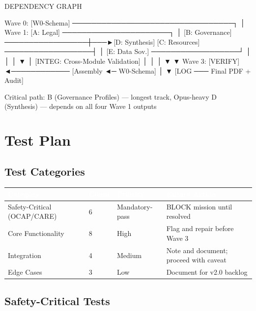 \documentclass[11pt,letterpaper]{article}
\newcommand{\tableheader}[1]{\textbf{\sffamily\textcolor{white}{#1}}}
\begin{document}
\begin{asciibox}
DEPENDENCY GRAPH

Wave 0: [W0-Schema] ─────────────────────────────────┐
                                                      │
Wave 1:  [A: Legal] ──────────────────────┐           │
         [B: Governance] ─────────────────┼───►[D: Synthesis]
         [C: Resources] ──────────────────┤           │
         [E: Data Sov.] ──────────────────┘           │
                              │                        │
                              ▼                        │
           [INTEG: Cross-Module Validation]            │
                              │                        │
                              ▼                        ▼
Wave 3:          [VERIFY] ◄──────────── [Assembly ◄─ W0-Schema]
                    │
                    ▼
                [LOG ─── Final PDF + Audit]

Critical path: B (Governance Profiles) — longest track, Opus-heavy
               D (Synthesis) — depends on all four Wave 1 outputs
\end{asciibox}

\section{Test Plan}

\subsection{Test Categories}

\begin{center}
\begin{tabularx}{\textwidth}{L{3.5cm}C{1.5cm}L{2cm}X}
\toprule
{}
\tableheader{Category} & \tableheader{Count} & \tableheader{Priority} & \tableheader{Failure Action} \\
\midrule
Safety-Critical (OCAP/CARE) & 6 & Mandatory-pass & BLOCK mission until resolved \\
Core Functionality & 8 & High & Flag and repair before Wave 3 \\
Integration & 4 & Medium & Note and document; proceed with caveat \\
Edge Cases & 3 & Low & Document for v2.0 backlog \\
\bottomrule
\end{tabularx}
\end{center}

\subsection{Safety-Critical Tests}
\end{document}
